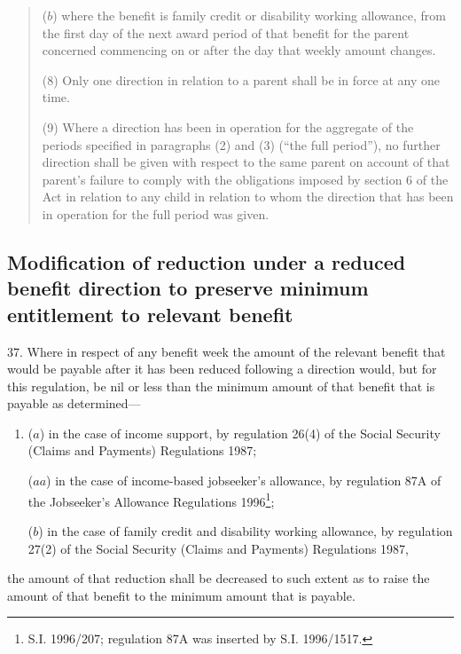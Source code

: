 \documentclass[a4paper]{article}
\begin{document}
{\begin{quotation}
\begin{enumerate}
($b$) where the benefit is family credit or disability working allowance, from the first day of the next award period of that benefit for the parent concerned commencing on or after the day that weekly amount changes.
\end{enumerate}

(8) Only one direction in relation to a parent shall be in force at any one time.

(9) Where a direction has been in operation for the aggregate of the periods specified in paragraphs (2) and (3) (“the full period”), no further direction shall be given with respect to the same parent on account of that parent’s failure to comply with the obligations imposed by section 6 of the Act in relation to any child in relation to whom the direction that has been in operation for the full period was given.
\end{quotation}
}

\subsection[37. Modification of reduction under a reduced benefit direction to preserve minimum entitlement to relevant benefit]{Modification of reduction under a reduced benefit direction to preserve minimum entitlement to relevant benefit}

37.  Where in respect of any benefit week the amount of the relevant benefit that would be payable after it has been reduced following a direction would, but for this regulation, be nil or less than the minimum amount of that benefit that is payable as determined—
\begin{enumerate}\item[]
($a$) in the case of income support, by regulation 26(4) of the Social Security (Claims and Payments) Regulations 1987;

($aa$) in the case of income-based jobseeker’s allowance, by regulation 
87A of the Jobseeker’s Allowance Regulations 1996\footnote{\frenchspacing S.I. 1996/207; regulation 87A was inserted by S.I. 1996/1517.};  %

($b$) in the case of family credit and disability working allowance, by regulation 27(2) 
of the Social Security (Claims and Payments) Regulations 1987,  %
\end{enumerate}
the amount of that reduction shall be decreased to such extent as to raise the amount of that benefit to the minimum amount that is payable.
\end{document}
